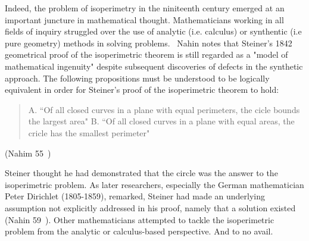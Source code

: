 \documentclass[a4paper]{book}
\begin{document}
Indeed, the problem of isoperimetry in the niniteenth century emerged at an important juncture in mathematical thought. Mathematicians working in all fields of inquiry struggled over the use of analytic (i.e. calculus) or synthentic (i.e pure geometry) methods in solving problems.~\cite{wiegert2010sagacity} Nahin notes that Steiner's 1842 geometrical proof of the isoperimetric theorem is still regarded as a "model of mathematical ingenuity" despite subsequent discoveries of defects in the synthetic approach. The following propositions must be understood to be logically equivalent in order for Steiner's proof of the isoperimetric theorem to hold:
\begin{center}
    \begin{quote}
        A. ``Of all closed curves in a plane with equal perimeters, the cicle bounds the largest area"
        \newline
        [and]
        \newline
        B. ``Of all closed curves in a plane with equal areas, the cricle has the smallest perimeter"
    \end{quote}
    (Nahim 55~\cite{nahin2021least})
\end{center}

Steiner thought he had demonstrated that the circle was the answer to the isoperimetric problem. As later researchers, especially the German mathematician Peter Dirichlet (1805-1859), remarked, Steiner had made an underlying assumption not explicitly addressed in his proof, namely that a solution existed (Nahin 59~\cite{nahin2021least}).
\newline
\newline
Other mathematicians attempted to tackle the isoperimetric problem from the analytic or calculus-based perspective. And to no avail.
\end{document}
